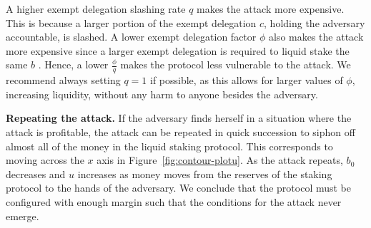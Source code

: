 A higher exempt delegation slashing rate $q$ makes the attack more expensive. This
is because a larger portion of the exempt delegation $c$, holding the adversary accountable,
is slashed. A lower exempt delegation factor $\phi$ also makes the attack more expensive
since a larger exempt delegation is required to liquid stake the same $b$ \asset.
Hence, a lower $\frac{\phi}{q}$ makes the protocol less vulnerable to the attack.
We recommend always setting $q = 1$ if possible, as this allows for
larger values of $\phi$, increasing liquidity, without any harm to anyone
besides the adversary.


\noindent
\textbf{Repeating the attack.} If the adversary finds herself in a situation
where the attack is profitable, the attack can be repeated in quick succession
to siphon off almost all of the money in the liquid staking protocol.
This corresponds to moving across the $x$ axis in Figure~\ref{fig:contour-plotu}.
As the attack repeats, $b_0$ decreases and $u$ increases as money moves from
the reserves of the staking protocol to the hands of the adversary.
We conclude that the protocol must be configured with enough margin
such that the conditions for the attack never emerge.





